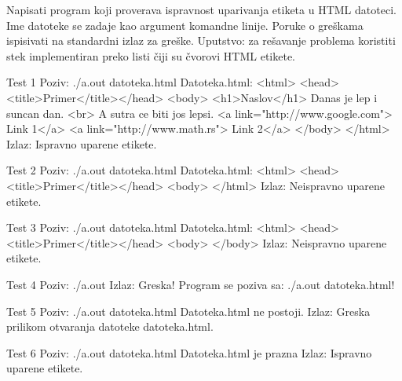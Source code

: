 \begin{Exercise}[label=605]
Napisati program koji proverava ispravnost uparivanja etiketa u HTML datoteci. Ime datoteke se zadaje kao argument komandne linije.
Poruke o greškama ispisivati na standardni izlaz za greške.
Uputstvo: za rešavanje problema koristiti stek implementiran preko listi čiji su čvorovi HTML etikete.
\begin{maxitest}
\begin{test}{Test 1}
Poziv: ./a.out datoteka.html
Datoteka.html:                          
<html>                                  
  <head><title>Primer</title></head>               
  <body>                                           
    <h1>Naslov</h1>                                
    Danas je lep i suncan dan. <br>                
    A sutra ce biti jos lepsi.     
    <a link="http://www.google.com"> Link 1</a>    
    <a link="http://www.math.rs"> Link 2</a>
  </body>
</html>
Izlaz: 
  Ispravno uparene etikete.
\end{test}
\end{maxitest}
\begin{maxitest}    
\begin{test}{Test 2}
Poziv: ./a.out datoteka.html
Datoteka.html:                         
<html>                                 
  <head><title>Primer</title></head>               
  <body>  
</html>
Izlaz: 
  Neispravno uparene etikete.
\end{test}
\end{maxitest}
\begin{maxitest}      
\begin{test}{Test 3}
Poziv: ./a.out datoteka.html
Datoteka.html:                         
<html>                                  
  <head><title>Primer</title></head>               
  <body>  
  </body>
Izlaz: 
  Neispravno uparene etikete.
\end{test}
\end{maxitest}
\begin{maxitest}
\begin{test}{Test 4}
Poziv: ./a.out 
Izlaz: 
  Greska! Program se poziva sa: ./a.out datoteka.html!
\end{test}
\end{maxitest}
\begin{maxitest}
\begin{test}{Test 5}
Poziv: ./a.out datoteka.html
Datoteka.html ne postoji.
Izlaz: 
  Greska prilikom otvaranja datoteke datoteka.html.
\end{test}
\end{maxitest}
\begin{maxitest}
\begin{test}{Test 6}
Poziv: ./a.out datoteka.html
Datoteka.html je prazna
Izlaz: 
  Ispravno uparene etikete.
\end{test}
\end{maxitest}
\end{Exercise}
\begin{Answer}[ref=605]
\end{Answer}

